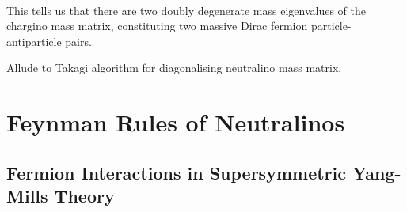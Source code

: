\documentclass[../main.tex]{subfiles}
\begin{document}
\begin{align}
\end{align}
This tells us that there are two doubly degenerate mass eigenvalues of the chargino mass matrix, constituting two massive Dirac fermion particle-antiparticle pairs.
\begin{temporary}
  Allude to Takagi algorithm for diagonalising neutralino mass matrix.
\end{temporary}





\section{Feynman Rules of Neutralinos}


\subsection{Fermion Interactions in Supersymmetric Yang-Mills Theory}
\end{document}
